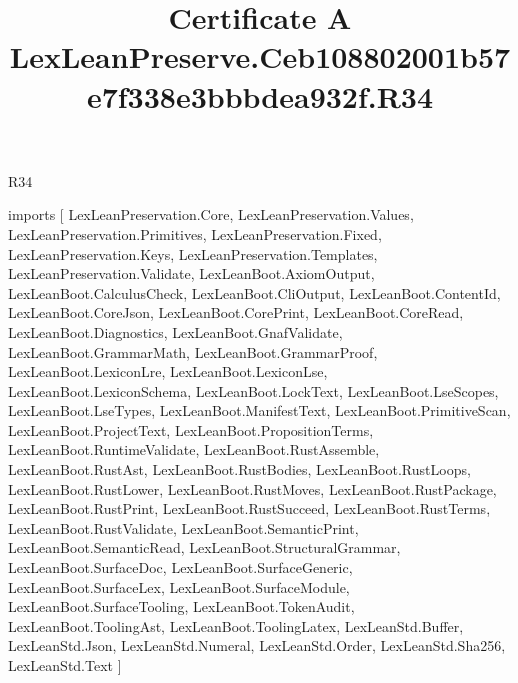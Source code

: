 \begin{lexlean}{R34}
\title{Certificate A LexLeanPreserve.Ceb108802001b57e7f338e3bbbdea932f.R34}
\begin{coremodule}
imports [
  LexLeanPreservation.Core,
  LexLeanPreservation.Values,
  LexLeanPreservation.Primitives,
  LexLeanPreservation.Fixed,
  LexLeanPreservation.Keys,
  LexLeanPreservation.Templates,
  LexLeanPreservation.Validate,
  LexLeanBoot.AxiomOutput,
  LexLeanBoot.CalculusCheck,
  LexLeanBoot.CliOutput,
  LexLeanBoot.ContentId,
  LexLeanBoot.CoreJson,
  LexLeanBoot.CorePrint,
  LexLeanBoot.CoreRead,
  LexLeanBoot.Diagnostics,
  LexLeanBoot.GnafValidate,
  LexLeanBoot.GrammarMath,
  LexLeanBoot.GrammarProof,
  LexLeanBoot.LexiconLre,
  LexLeanBoot.LexiconLse,
  LexLeanBoot.LexiconSchema,
  LexLeanBoot.LockText,
  LexLeanBoot.LseScopes,
  LexLeanBoot.LseTypes,
  LexLeanBoot.ManifestText,
  LexLeanBoot.PrimitiveScan,
  LexLeanBoot.ProjectText,
  LexLeanBoot.PropositionTerms,
  LexLeanBoot.RuntimeValidate,
  LexLeanBoot.RustAssemble,
  LexLeanBoot.RustAst,
  LexLeanBoot.RustBodies,
  LexLeanBoot.RustLoops,
  LexLeanBoot.RustLower,
  LexLeanBoot.RustMoves,
  LexLeanBoot.RustPackage,
  LexLeanBoot.RustPrint,
  LexLeanBoot.RustSucceed,
  LexLeanBoot.RustTerms,
  LexLeanBoot.RustValidate,
  LexLeanBoot.SemanticPrint,
  LexLeanBoot.SemanticRead,
  LexLeanBoot.StructuralGrammar,
  LexLeanBoot.SurfaceDoc,
  LexLeanBoot.SurfaceGeneric,
  LexLeanBoot.SurfaceLex,
  LexLeanBoot.SurfaceModule,
  LexLeanBoot.SurfaceTooling,
  LexLeanBoot.TokenAudit,
  LexLeanBoot.ToolingAst,
  LexLeanBoot.ToolingLatex,
  LexLeanStd.Buffer,
  LexLeanStd.Json,
  LexLeanStd.Numeral,
  LexLeanStd.Order,
  LexLeanStd.Sha256,
  LexLeanStd.Text
]


\end{coremodule}
\end{lexlean}
